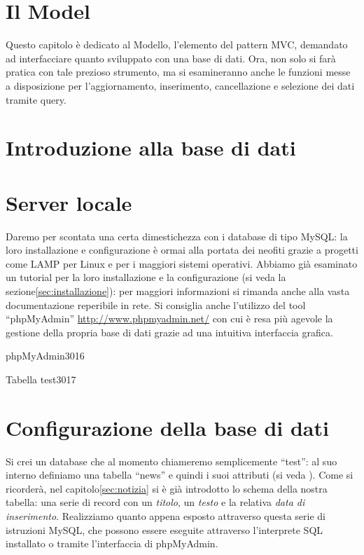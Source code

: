 \section{Il Model}
\label{cap:model}

Questo capitolo è dedicato al Modello, l'elemento del pattern \ac{MVC}, demandato ad interfacciare quanto sviluppato con una base di dati. Ora, non solo si farà pratica con tale prezioso strumento, ma si esamineranno anche le funzioni messe a disposizione per l'aggiornamento, inserimento, cancellazione e selezione dei dati tramite query.

\section*{Introduzione alla base di dati}
\omissis

\section*{Server locale}
Daremo per scontata una certa dimestichezza con i database di tipo MySQL: la loro installazione e configurazione è ormai alla portata dei neofiti grazie a progetti come LAMP per Linux e per i maggiori sistemi operativi. Abbiamo già esaminato un tutorial per la loro installazione e la configurazione (si veda la sezione\vref{sec:installazione}): per maggiori informazioni si rimanda anche alla vasta documentazione reperibile in rete. Si consiglia anche l'utilizzo del tool ``phpMyAdmin'' \url{http://www.phpmyadmin.net/} con cui è resa più agevole la gestione della propria base di dati grazie ad una intuitiva interfaccia grafica.

\begin{img}{phpMyAdmin}{3}{016}
\end{img}

\begin{img}{Tabella test}{3}{017}
\end{img}

\section*{Configurazione della base di dati}
Si crei un database che al momento chiameremo semplicemente ``test'': al suo interno definiamo una tabella ``news'' e quindi i suoi attributi (si veda ). Come si ricorderà, nel capitolo\vref{sec:notizia} si è già introdotto lo schema della nostra tabella: una serie di record con un \emph{titolo}, un \emph{testo} e la relativa \emph{data di inserimento}. Realizziamo quanto appena esposto attraverso questa serie di istruzioni MySQL, che possono essere eseguite attraverso l'interprete SQL installato o tramite l'interfaccia di phpMyAdmin.

